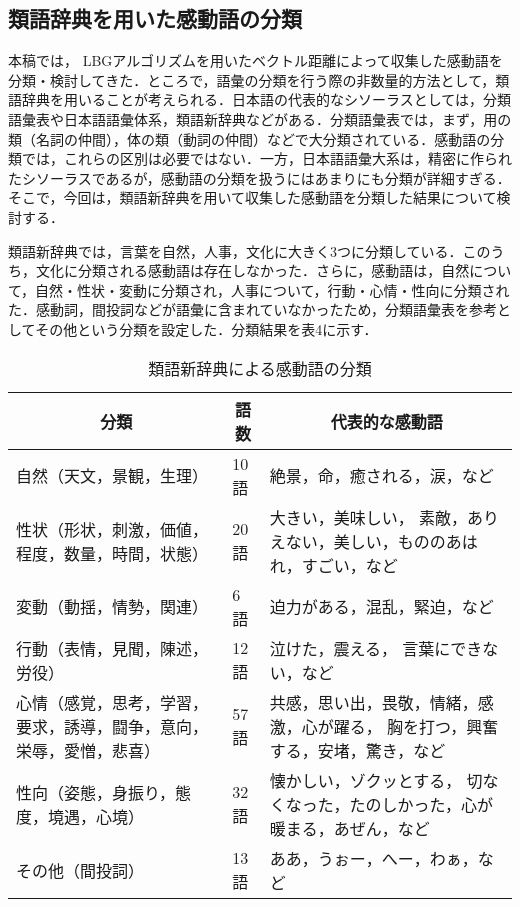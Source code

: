 \documentclass[japanese]{jnlp_1.3c}
\begin{document}
\subsection{類語辞典を用いた感動語の分類}

本稿では， LBGアルゴリズムを用いたベクトル距離によって収集した感動語を分類・検討してきた．ところで，語彙の分類を行う際の非数量的方法として，類語辞典を用いることが考えられる．日本語の代表的なシソーラスとしては，分類語彙表\cite{Book_102}や日本語語彙体系\cite{Book_106}，類語新辞典\cite{Book_107}などがある．分類語彙表では，まず，用の類（名詞の仲間），体の類（動詞の仲間）などで大分類されている．感動語の分類では，これらの区別は必要ではない．一方，日本語語彙大系は，精密に作られたシソーラスであるが，感動語の分類を扱うにはあまりにも分類が詳細すぎる．そこで，今回は，類語新辞典を用いて収集した感動語を分類した結果について検討する．


類語新辞典では，言葉を自然，人事，文化に大きく3つに分類している．このうち，文化に分類される感動語は存在しなかった．さらに，感動語は，自然について，自然・性状・変動に分類され，人事について，行動・心情・性向に分類された．感動詞，間投詞などが語彙に含まれていなかったため，分類語彙表を参考としてその他という分類を設定した．分類結果を表4に示す．



\begin{table}[tb]
\begin{center}
\caption{類語新辞典による感動語の分類}
\begin{tabular*}{140mm}{|p{52mm}|p{8mm}|p{70mm}|}\hline
\multicolumn{1}{|c|}{分類} &
\multicolumn{1}{|c|}{語数} & 
\multicolumn{1}{|c|}{代表的な感動語}                           \\ \hline
自然（天文，景観，生理） & 10語 & 絶景，命，癒される，涙，など \\ \hline
性状（形状，刺激，価値，程度，数量，時間，状態） & 20語 & 大きい，美味しい，
素敵，ありえない，美しい，もののあはれ，すごい，など           \\ \hline
変動（動揺，情勢，関連） & 6語 & 迫力がある，混乱，緊迫，など  \\ \hline
行動（表情，見聞，陳述，労役） & 12語 & 泣けた，震える，
                                          言葉にできない，など \\ \hline
心情（感覚，思考，学習，要求，誘導，闘争，意向，栄辱，愛憎，悲喜）
 & 57語 & 共感，思い出，畏敬，情緒，感激，心が躍る，
                          胸を打つ，興奮する，安堵，驚き，など \\ \hline
性向（姿態，身振り，態度，境遇，心境） & 32語 & 懐かしい，ゾクッとする，
          切なくなった，たのしかった，心が暖まる，あぜん，など \\ \hline
その他（間投詞） & 13語 & ああ，うぉー，へー，わぁ，など       \\ \hline
\end{tabular*}
\end{center}
\end{table}
\end{document}
